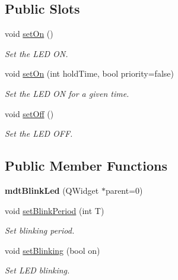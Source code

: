 \subsection*{Public Slots}
\begin{DoxyCompactItemize}
\item 
void \hyperlink{classmdt_blink_led_ae51c54f31a11dbaebe69ab2c0b814d0f}{setOn} ()
\begin{DoxyCompactList}\small\item\em Set the LED ON. \end{DoxyCompactList}\item 
void \hyperlink{classmdt_blink_led_aab370ebe5c53203947e49e794d0959a7}{setOn} (int holdTime, bool priority=false)
\begin{DoxyCompactList}\small\item\em Set the LED ON for a given time. \end{DoxyCompactList}\item 
void \hyperlink{classmdt_blink_led_a951465e8a9ae5167e7eb05a7107ab13f}{setOff} ()
\begin{DoxyCompactList}\small\item\em Set the LED OFF. \end{DoxyCompactList}\end{DoxyCompactItemize}
\subsection*{Public Member Functions}
\begin{DoxyCompactItemize}
\item 
\hypertarget{classmdt_blink_led_abbc96bc408a45ceb191a908b2808a235}{
{\bfseries mdtBlinkLed} (QWidget $\ast$parent=0)}
\label{classmdt_blink_led_abbc96bc408a45ceb191a908b2808a235}

\item 
void \hyperlink{classmdt_blink_led_ae2dc395378aed0705ff19db5096a1efc}{setBlinkPeriod} (int T)
\begin{DoxyCompactList}\small\item\em Set blinking period. \end{DoxyCompactList}\item 
void \hyperlink{classmdt_blink_led_a1b15c8fafec0bc3aeb31ddf284ca7be2}{setBlinking} (bool on)
\begin{DoxyCompactList}\small\item\em Set LED blinking. \end{DoxyCompactList}\end{DoxyCompactItemize}


